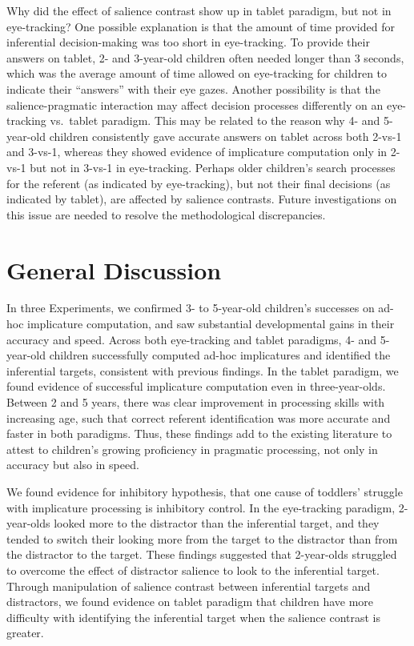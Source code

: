 \documentclass[a4paper,man,apacite,floatsintext]{apa6}
\begin{document}
Why did the effect of salience contrast show up in tablet paradigm, but
not in eye-tracking? One possible explanation is that the amount of time
provided for inferential decision-making was too short in eye-tracking.
To provide their answers on tablet, 2- and 3-year-old children often
needed longer than 3 seconds, which was the average amount of time
allowed on eye-tracking for children to indicate their ``answers'' with
their eye gazes. Another possibility is that the salience-pragmatic
interaction may affect decision processes differently on an eye-tracking
vs.~tablet paradigm. This may be related to the reason why 4- and
5-year-old children consistently gave accurate answers on tablet across
both 2-vs-1 and 3-vs-1, whereas they showed evidence of implicature
computation only in 2-vs-1 but not in 3-vs-1 in eye-tracking. Perhaps
older children's search processes for the referent (as indicated by
eye-tracking), but not their final decisions (as indicated by tablet),
are affected by salience contrasts. Future investigations on this issue
are needed to resolve the methodological discrepancies.

\section{General Discussion}\label{general-discussion}

In three Experiments, we confirmed 3- to 5-year-old children's successes
on ad-hoc implicature computation, and saw substantial developmental
gains in their accuracy and speed. Across both eye-tracking and tablet
paradigms, 4- and 5-year-old children successfully computed ad-hoc
implicatures and identified the inferential targets, consistent with
previous findings. In the tablet paradigm, we found evidence of
successful implicature computation even in three-year-olds. Between 2
and 5 years, there was clear improvement in processing skills with
increasing age, such that correct referent identification was more
accurate and faster in both paradigms. Thus, these findings add to the
existing literature to attest to children's growing proficiency in
pragmatic processing, not only in accuracy but also in speed.

We found evidence for inhibitory hypothesis, that one cause of toddlers'
struggle with implicature processing is inhibitory control. In the
eye-tracking paradigm, 2-year-olds looked more to the distractor than
the inferential target, and they tended to switch their looking more
from the target to the distractor than from the distractor to the
target. These findings suggested that 2-year-olds struggled to overcome
the effect of distractor salience to look to the inferential target.
Through manipulation of salience contrast between inferential targets
and distractors, we found evidence on tablet paradigm that children have
more difficulty with identifying the inferential target when the
salience contrast is greater.
\end{document}
